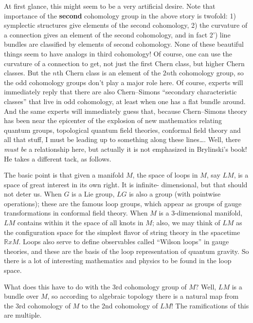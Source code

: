 \documentclass{article}
\begin{document}
At first glance, this might seem to be a very artificial desire. Note
that importance of the \textbf{second} cohomology group in the above
story is twofold: 1) symplectic structures give elements of the second
cohomology, 2) the curvature of a connection gives an element of the
second cohomology, and in fact 2') line bundles are classified by
elements of second cohomology. None of these beautiful things seem to
have analogs in third cohomology! Of course, one can use the curvature
of a connection to get, not just the first Chern class, but higher Chern
classes. But the \(n\)th Chern class is an element of the \(2n\)th
cohomology group, so the odd cohomology groups don't play a major role
here. Of course, experts will immediately reply that there are also
Chern--Simons ``secondary characteristic classes'' that live in odd
cohomology, at least when one has a flat bundle around. And the same
experts will immediately guess that, because Chern--Simons theory has
been near the epicenter of the explosion of new mathematics relating
quantum groups, topological quantum field theories, conformal field
theory and all that stuff, I must be leading up to something along these
lines\ldots. Well, there \emph{must be} a relationship here, but
actually it is not emphasized in Brylinski's book! He takes a different
tack, as follows.

The basic point is that given a manifold \(M\), the space of loops in
\(M\), say \(LM\), is a space of great interest in its own right. It is
infinite- dimensional, but that should not deter us. When \(G\) is a Lie
group, \(LG\) is also a group (with pointwise operations); these are the
famous loop groups, which appear as groups of gauge transformations in
conformal field theory. When \(M\) is a \(3\)-dimensional manifold,
\(LM\) contains within it the space of all knots in \(M\); also, we may
think of \(LM\) as the configuration space for the simplest flavor of
string theory in the spacetime \(\mathbb{R} x M\). Loops also serve to
define observables called ``Wilson loops'' in gauge theories, and these
are the basis of the loop representation of quantum gravity. So there is
a lot of interesting mathematics and physics to be found in the loop
space.

What does this have to do with the 3rd cohomology group of \(M\)? Well,
\(LM\) is a bundle over \(M\), so according to algebraic topology there
is a natural map from the 3rd cohomology of \(M\) to the 2nd cohomology
of \(LM\)! The ramifications of this are multiple.
\end{document}
